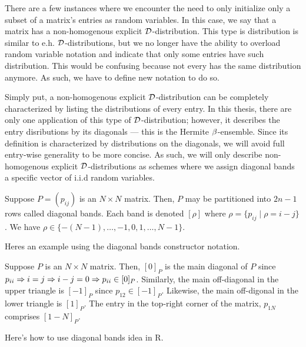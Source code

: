 
There are a few instances where we encounter the need to only initialize only a subset of a matrix's entries as random variables. In this case, we say that a matrix has a non-homogenous explicit $\mathcal{D}$-distribution.
This type is distribution is similar to e.h. $\mathcal{D}$-distributions, but we no longer have the ability to overload random variable notation and indicate that only some entries have such distribution. This would be
confusing because not every has the same distribution anymore. As such, we have to define new notation to do so.

Simply put, a non-homogenous explicit $\mathcal{D}$-distribution can be completely characterized by listing the distributions of every entry.
In this thesis, there are only one application of this type of $\mathcal{D}$-distribution; however, it describes the entry disributions by its diagonals --- this is the Hermite $\beta$-ensemble.
Since its definition is characterized by distributions on the diagonals, we will avoid full entry-wise generality to be more concise.
As such, we will only describe non-homogenous explicit $\mathcal{D}$-distributions as schemes where we assign diagonal bands a specific vector of i.i.d random variables.

\begin{definition}
Suppose $P = (p_{ij})$ is an $N \times N$ matrix. Then, $P$ may be partitioned into $2n - 1$ rows called diagonal bands. Each band is denoted $[\rho]$ where $\rho = \{p_{ij} \mid \rho = i - j\}$. We have
$\rho \in \{ -(N-1), \dots, -1, 0, 1, \dots, N-1 \}$.
\end{definition}

Heres an example using the diagonal bands constructor notation.

\begin{example}
Suppose $P$ is an $N \times N$ matrix. Then, $[0]_P$ is the main diagonal of $P$ since $p_{ii} \Rightarrow i = j \Rightarrow i - j = 0 \Rightarrow p_{ii} \in [0]_P$.
Similarly, the main off-diagonal in the upper triangle is $[-1]_P$ since $p_{12} \in [-1]_P$.
Likewise, the main off-digonal in the lower triangle is $[1]_P$. The entry in the top-right corner of the matrix, $p_{1N}$ comprises $[1 - N]_P$.
\end{example}

\begin{code}
Here's how to use diagonal bands idea in R.
\end{code}

